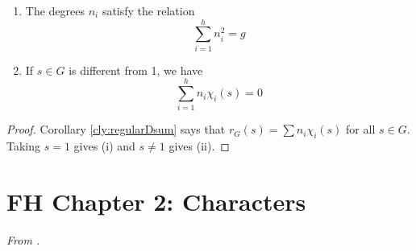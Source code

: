 \documentclass[../notes.tex]{subfiles}
\begin{document}
\begin{itemize}
\begin{corollary}
        \leavevmode
        \begin{enumerate}[label={\textup{(\roman*)}},ref={\thecorollary\roman*}]
            \item \label{cly:columnOrthoi}The degrees $n_i$ satisfy the relation
            \begin{equation*}
                \sum_{i=1}^hn_i^2 = g
            \end{equation*}
            \item \label{cly:columnOrthoii}If $s\in G$ is different from 1, we have
            \begin{equation*}
                \sum_{i=1}^hn_i\chi_i(s) = 0
            \end{equation*}
        \end{enumerate}
        \begin{proof}
            Corollary \ref{cly:regularDsum} says that $r_G(s)=\sum n_i\chi_i(s)$ for all $s\in G$. Taking $s=1$ gives (i) and $s\neq 1$ gives (ii).
        \end{proof}
    \end{corollary}
\end{itemize}



\section{FH Chapter 2: Characters}
\setcounter{FHchapter}{2}
\emph{From \textcite{bib:FultonHarris}.}
\end{document}

